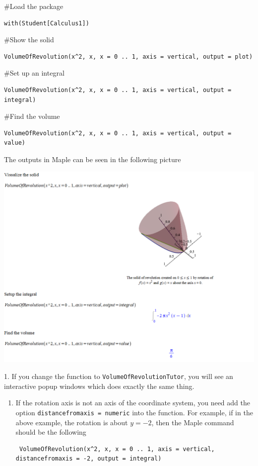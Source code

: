 \documentclass[]{book}
\theoremstyle{definition}
\theoremstyle{definition}
\theoremstyle{definition}
\theoremstyle{remark}
\let\BeginKnitrBlock\begin \let\EndKnitrBlock\end
\begin{document}
\BeginKnitrBlock{solution}
{}

\#Load the package

\begin{verbatim}
with(Student[Calculus1])
\end{verbatim}

\#Show the solid

\begin{verbatim}
VolumeOfRevolution(x^2, x, x = 0 .. 1, axis = vertical, output = plot)
\end{verbatim}

\#Set up an integral

\begin{verbatim}
VolumeOfRevolution(x^2, x, x = 0 .. 1, axis = vertical, output = integral)
\end{verbatim}

\#Find the volume

\begin{verbatim}
VolumeOfRevolution(x^2, x, x = 0 .. 1, axis = vertical, output = value)
\end{verbatim}

The outputs in Maple can be seen in the following picture

\includegraphics{figs/VolOfRev-Example1.png}
\EndKnitrBlock{solution}

\BeginKnitrBlock{remark}
{}1. If you change the function to \texttt{VolumeOfRevolutionTutor}, you will see an interactive popup windows which does exactly the same thing.

\begin{enumerate}
\def\labelenumi{\arabic{enumi}.}
\setcounter{enumi}{1}
\item
  If the rotation axis is not an axis of the coordinate system, you need add the option \texttt{distancefromaxis\ =\ numeric} into the function. For example, if in the above example, the rotation is about \(y=-2\), then the Maple command should be the following

\begin{verbatim}
 VolumeOfRevolution(x^2, x, x = 0 .. 1, axis = vertical, distancefromaxis = -2, output = integral)
\end{verbatim}
\end{enumerate}
\EndKnitrBlock{remark}
\end{document}
